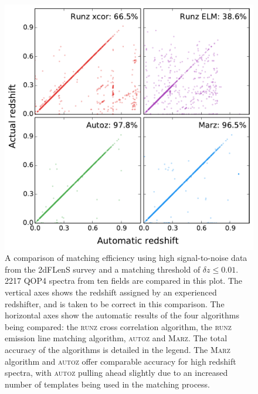 \documentclass[iop]{emulateapj}
\newcommand{\runz}{\textsc{runz}}
\newcommand{\autoz}{\textsc{autoz}}
\newcommand{\marz}{\textsc{Marz}}
\begin{document}
\begin{figure}[t]
\centering
\includegraphics[width=\columnwidth]{2dfComp.pdf}
\caption{A comparison of matching efficiency using high signal-to-noise data from the 2dFLenS survey and a matching threshold of $\delta z \leq 0.01$. 2217 QOP4 spectra from ten fields are compared in this plot. The vertical axes shows the redshift assigned by an experienced redshifter, and is taken to be correct in this comparison. The horizontal axes show the automatic results of the four algorithms being compared: the \runz{} cross correlation algorithm, the \runz{} emission line matching algorithm, \autoz{} and \marz{}. The total accuracy of the algorithms is detailed in the legend. The \marz{} algorithm and \autoz{} offer comparable accuracy for high redshift spectra, with \autoz{} pulling ahead slightly due to an increased number of templates being used in the matching process.}
\label{fig:high}
\end{figure}
\end{document}
